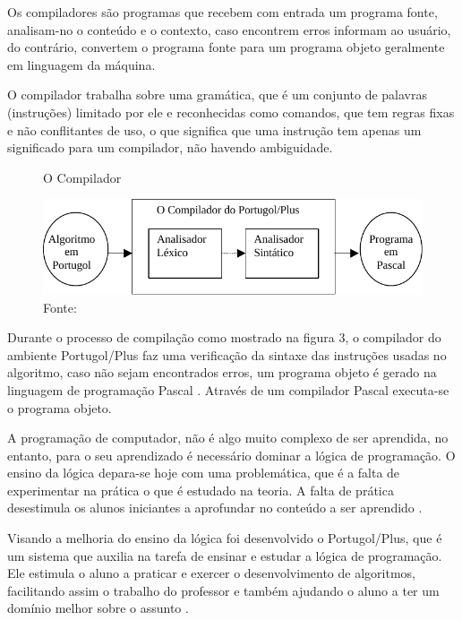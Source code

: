 \begin{enumerate}
Os compiladores são programas que recebem com entrada um programa fonte,
analisam-no o conteúdo e o contexto, caso encontrem erros informam ao usuário,
do contrário, convertem o programa fonte para um programa objeto geralmente em
linguagem da máquina.

O compilador trabalha sobre uma gramática, que é um conjunto de palavras
(instruções) limitado por ele e reconhecidas como comandos, que tem regras fixas
e não conflitantes de uso, o que significa que uma instrução tem apenas um
significado para um compilador, não havendo ambiguidade.

  \begin{figure}[h]
    \centering
    \caption{O Compilador}\label{fig:portugolplus-compilador}
    \includegraphics{figures/portugolplus-compilador.pdf}
    \caption*{\footnotesize Fonte: }
  \end{figure}

Durante o processo de compilação como mostrado na figura 3, o compilador do
ambiente Portugol/Plus faz uma verificação da sintaxe das instruções usadas no
algoritmo, caso não sejam encontrados erros, um programa objeto é gerado na
linguagem de programação Pascal \cite{farreretal1995}. Através de um compilador
Pascal executa-se o programa objeto.

\end{enumerate}

A programação de computador, não é algo muito complexo de ser aprendida, no
entanto, para o seu aprendizado é necessário dominar a lógica de programação.
O ensino da lógica depara-se hoje com uma problemática, que é a falta de
experimentar na prática o que é estudado na teoria. A falta de prática
desestimula os alunos iniciantes a aprofundar no conteúdo a ser aprendido
\cite{118}.

Visando a melhoria do ensino da lógica foi desenvolvido o Portugol/Plus, que
é um sistema que auxilia na tarefa de ensinar e estudar a lógica de programação.
Ele estimula o aluno a praticar e exercer o desenvolvimento de algoritmos,
facilitando assim o trabalho do professor e também ajudando o aluno a ter um
domínio melhor sobre o assunto \cite{118}.

